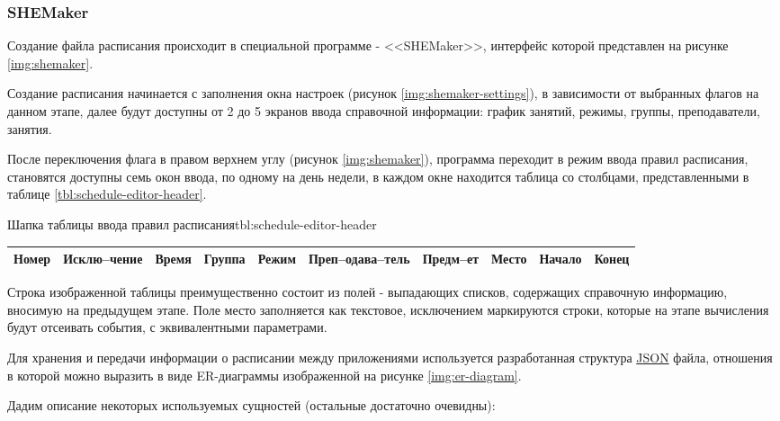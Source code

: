 \subsubsection{SHEMaker}

Создание файла расписания происходит в специальной программе - <<SHEMaker>>, интерфейс которой представлен на рисунке \ref{img:shemaker}.


Создание расписания начинается с заполнения окна настроек (рисунок \ref{img:shemaker-settings}), в зависимости от выбранных флагов на данном этапе, далее будут доступны от 2 до 5 экранов ввода справочной информации: график занятий, режимы, группы, преподаватели, занятия.


После переключения флага в правом верхнем углу (рисунок \ref{img:shemaker}), программа переходит в режим ввода правил расписания, становятся доступны семь окон ввода, по одному на день недели, в каждом окне находится таблица со столбцами, представленными в таблице \ref{tbl:schedule-editor-header}.

\begin{tbl}{Шапка таблицы ввода правил расписания}{tbl:schedule-editor-header}
  \begin{tabularx}{\textwidth}{| *{10}{X |}}
    \hline Номер
    & Исклю--чение
    & Время
    & Группа
    & Режим
    & Преп--одава--тель
    & Предм--ет
    & Место
    & Начало
    & Конец \\
    \hline
  \end{tabularx}
\end{tbl}

Строка изображенной таблицы преимущественно состоит из полей - выпадающих списков, содержащих справочную информацию, вносимую на предыдущем этапе.
Поле место заполняется как текстовое, исключением маркируются строки, которые на этапе вычисления будут отсеивать события, с эквивалентными параметрами.

Для хранения и передачи информации о расписании между приложениями используется разработанная структура \hyperlink{json}{JSON} файла, отношения в которой можно выразить в виде ER-диаграммы изображенной на рисунке \ref{img:er-diagram}.


Дадим описание некоторых используемых сущностей (остальные достаточно очевидны):

